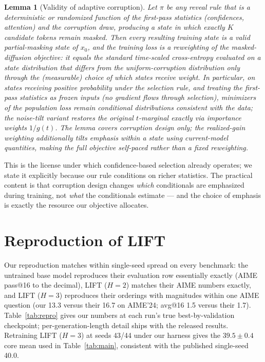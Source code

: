 \documentclass{article} %
\newtheorem{lemma}{Lemma}
\begin{document}
\begin{lemma}[Validity of adaptive corruption]
\label{lem:valid}
Let $\pi$ be any reveal rule that is a deterministic or randomized function of the first-pass statistics (confidences, attention) and the corruption draw, producing a state in which exactly $K$ candidate tokens remain masked. Then every resulting training state is a valid partial-masking state of $x_0$, and the training loss is a reweighting of the masked-diffusion objective: it equals the standard time-scaled cross-entropy evaluated on a state distribution that differs from the uniform-corruption distribution only through the (measurable) choice of which states receive weight. In particular, on states receiving positive probability under the selection rule, and treating the first-pass statistics as frozen inputs (no gradient flows through selection), minimizers of the population loss remain conditional distributions consistent with the data; the noise-tilt variant restores the original $t$-marginal exactly via importance weights $1/g(t)$. The lemma covers corruption design only; the realized-gain weighting additionally tilts emphasis \emph{within} a state using current-model quantities, making the full objective self-paced rather than a fixed reweighting.
\end{lemma}

This is the license under which confidence-based selection \citep{lift2026} already operates; we state it explicitly because our rule conditions on richer statistics. The practical content is that corruption design changes \emph{which} conditionals are emphasized during training, not \emph{what} the conditionals estimate --- and the choice of emphasis is exactly the resource our objective allocates.

\section{Reproduction of LIFT}
\label{app:repro}
Our reproduction matches \citet{lift2026} within single-seed spread on every benchmark: the untrained base model reproduces their evaluation row essentially exactly (AIME pass@16 to the decimal), LIFT ($H{=}2$) matches their AIME numbers exactly, and LIFT ($H{=}3$) reproduces their orderings with magnitudes within one AIME question (our 13.3 versus their 16.7 on AIME'24; avg@16 1.5 versus their 1.7). Table~\ref{tab:repro} gives our numbers at each run's true best-by-validation checkpoint; per-generation-length detail ships with the released results. Retraining LIFT ($H{=}3$) at seeds 43/44 under our harness gives the $39.5 \pm 0.4$ core mean used in Table~\ref{tab:main}, consistent with the published single-seed 40.0.
\end{document}
